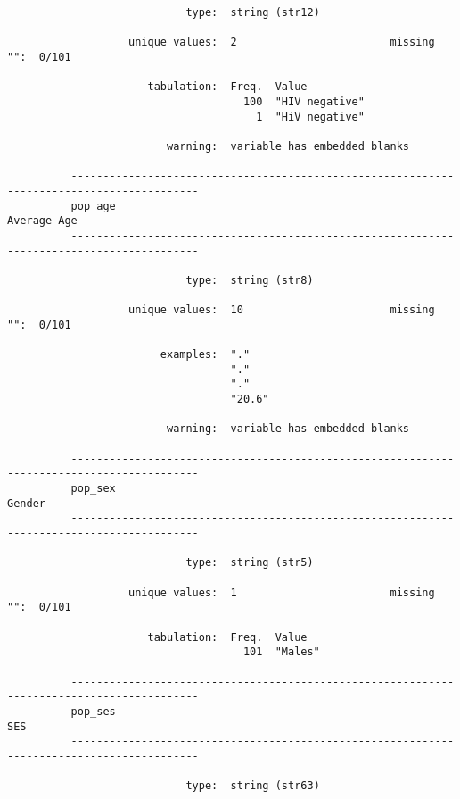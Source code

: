 \documentclass{article}
\begin{document}
\begin{verbatim}
                            type:  string (str12)
          
                   unique values:  2                        missing "":  0/101
          
                      tabulation:  Freq.  Value
                                     100  "HIV negative"
                                       1  "HiV negative"
          
                         warning:  variable has embedded blanks
          
          ------------------------------------------------------------------------------------------
          pop_age                                                                        Average Age
          ------------------------------------------------------------------------------------------
          
                            type:  string (str8)
          
                   unique values:  10                       missing "":  0/101
          
                        examples:  "."
                                   "."
                                   "."
                                   "20.6"
          
                         warning:  variable has embedded blanks
          
          ------------------------------------------------------------------------------------------
          pop_sex                                                                             Gender
          ------------------------------------------------------------------------------------------
          
                            type:  string (str5)
          
                   unique values:  1                        missing "":  0/101
          
                      tabulation:  Freq.  Value
                                     101  "Males"
          
          ------------------------------------------------------------------------------------------
          pop_ses                                                                                SES
          ------------------------------------------------------------------------------------------
          
                            type:  string (str63)
          

\end{verbatim}
\end{document}

